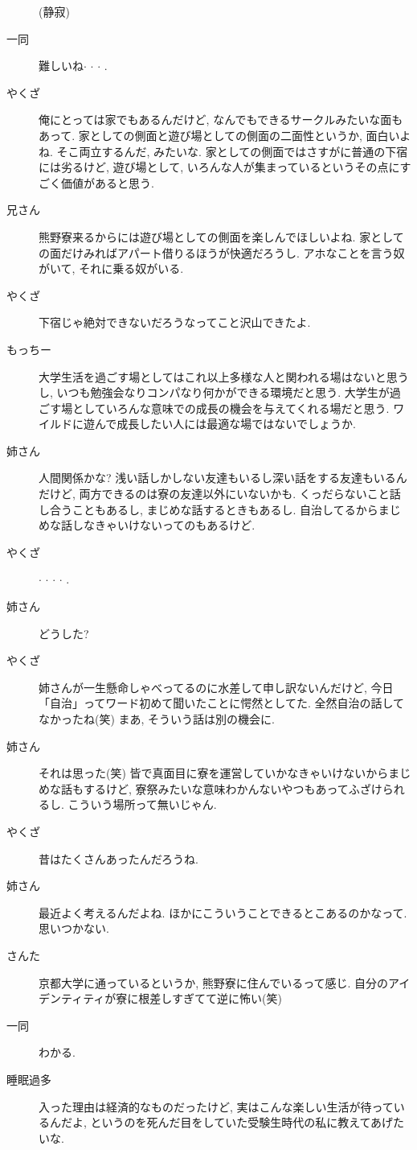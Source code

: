 \documentclass[10pt,b5jsbook,dvips,dvipdfmx,openany]{jsbook}
\theoremstyle{definition}
\begin{document}
\begin{multicols}{2}
\begin{description}
		(静寂)

		\item[ 一同 ]難しいね$ \cdot $ $ \cdot $ $ \cdot $ .
		\item[やくざ]俺にとっては家でもあるんだけど, なんでもできるサークルみたいな面もあって. 家としての側面と遊び場としての側面の二面性というか, 面白いよね. そこ両立するんだ, みたいな. 家としての側面ではさすがに普通の下宿には劣るけど, 遊び場として, いろんな人が集まっているというその点にすごく価値があると思う.
		\item[兄さん]熊野寮来るからには遊び場としての側面を楽しんでほしいよね. 家としての面だけみればアパート借りるほうが快適だろうし. アホなことを言う奴がいて, それに乗る奴がいる.
		\item[やくざ]下宿じゃ絶対できないだろうなってこと沢山できたよ.
		\item[もっちー]大学生活を過ごす場としてはこれ以上多様な人と関われる場はないと思うし, いつも勉強会なりコンパなり何かができる環境だと思う. 大学生が過ごす場としていろんな意味での成長の機会を与えてくれる場だと思う. ワイルドに遊んで成長したい人には最適な場ではないでしょうか.
		\item[姉さん]人間関係かな? 浅い話しかしない友達もいるし深い話をする友達もいるんだけど, 両方できるのは寮の友達以外にいないかも. くっだらないこと話し合うこともあるし, まじめな話するときもあるし. 自治してるからまじめな話しなきゃいけないってのもあるけど.
		\item[やくざ]$ \cdot $ $ \cdot $ $ \cdot $ $ \cdot $ .
		\item[姉さん]どうした?
		\item[やくざ]姉さんが一生懸命しゃべってるのに水差して申し訳ないんだけど, 今日「自治」ってワード初めて聞いたことに愕然としてた. 全然自治の話してなかったね(笑) まあ, そういう話は別の機会に.
		\item[姉さん]それは思った(笑) 皆で真面目に寮を運営していかなきゃいけないからまじめな話もするけど, 寮祭みたいな意味わかんないやつもあってふざけられるし. こういう場所って無いじゃん.
		\item[やくざ]昔はたくさんあったんだろうね.
		\item[姉さん]最近よく考えるんだよね. ほかにこういうことできるとこあるのかなって. 思いつかない.
		\item[さんた]京都大学に通っているというか, 熊野寮に住んでいるって感じ. 自分のアイデンティティが寮に根差しすぎてて逆に怖い(笑)
		\item[ 一同 ]わかる.
		\item[睡眠過多]入った理由は経済的なものだったけど, 実はこんな楽しい生活が待っているんだよ, というのを死んだ目をしていた受験生時代の私に教えてあげたいな.

\end{description}
\end{multicols}
\end{document}
